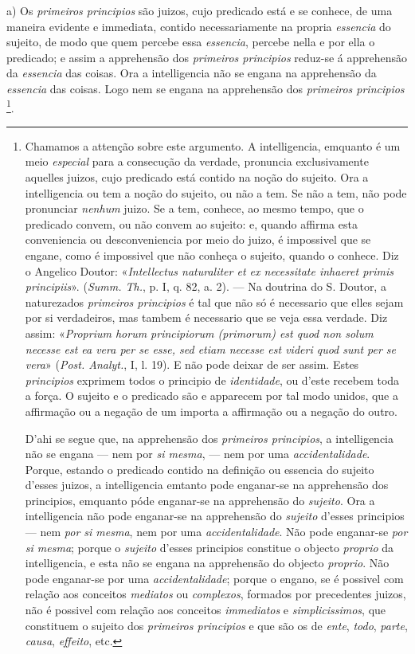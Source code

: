 a) Os \emph{primeiros principios} são juizos, cujo predicado está e se conhece, de uma maneira evidente e immediata, contido necessariamente na propria \emph{essencia} do sujeito, de modo que quem percebe essa \emph{essencia}, percebe nella e por ella o predicado; e assim a apprehensão dos \emph{primeiros principios} reduz-se á apprehensão da \emph{essencia} das coisas. Ora a intelligencia não se engana na apprehensão da \emph{essencia} das coisas. Logo nem se engana na apprehensão dos \emph{primeiros principios} \footnote{Chamamos a attenção sobre este argumento. A intelligencia, emquanto é um meio \emph{especial} para a consecução da verdade, pronuncia exclusivamente aquelles juizos, cujo predicado está contido na noção do sujeito. Ora a intelligencia ou tem a noção do sujeito, ou não a tem. Se não a tem, não pode pronunciar \emph{nenhum} juizo. Se a tem, conhece, ao mesmo tempo, que o predicado convem, ou não convem ao sujeito: e, quando affirma esta conveniencia ou desconveniencia por meio do juizo, é impossivel que se engane, como é impossivel que não conheça o sujeito, quando o conhece. Diz o Angelico Doutor: «\emph{Intellectus naturaliter et ex necessitate inhaeret primis principiis}». (\emph{Summ. Th.}, p. I, q. 82, a. 2). --- Na doutrina do S. Doutor, a naturezados \emph{primeiros principios} é tal que não só é necessario que elles sejam por si verdadeiros, mas tambem é necessario que se veja essa verdade. Diz assim: «\emph{Proprium horum principiorum (primorum) est quod non solum necesse est ea vera per se esse, sed etiam necesse est videri quod sunt per se vera}» (\emph{Post. Analyt.}, I, l. 19). E não pode deixar de ser assim. Estes \emph{principios} exprimem todos o principio de \emph{identidade}, ou d'este recebem toda a força. O sujeito e o predicado são e apparecem por tal modo unidos, que a affirmação ou a negação de um importa a affirmação ou a negação do outro.\par D'ahi se segue que, na apprehensão dos \emph{primeiros principios}, a intelligencia não se engana --- nem por \emph{si mesma}, --- nem por uma \emph{accidentalidade}. Porque, estando o predicado contido na definição ou essencia do sujeito d'esses juizos, a intelligencia emtanto pode enganar-se na apprehensão dos principios, emquanto póde enganar-se na apprehensão do \emph{sujeito}. Ora a intelligencia não pode enganar-se na apprehensão do \emph{sujeito} d'esses principios --- nem \emph{por si mesma}, nem por uma \emph{accidentalidade}. Não pode enganar-se \emph{por si mesma}; porque o \emph{sujeito} d'esses principios constitue o objecto \emph{proprio} da intelligencia, e esta não se engana na apprehensão do objecto \emph{proprio}. Não pode enganar-se por uma \emph{accidentalidade}; porque o engano, se é possivel com relação aos conceitos \emph{mediatos} ou \emph{complexos}, formados por precedentes juizos, não é possivel com relação aos conceitos \emph{immediatos} e \emph{simplicissimos}, que constituem o sujeito dos \emph{primeiros principios} e que são os de \emph{ente}, \emph{todo}, \emph{parte}, \emph{causa}, \emph{effeito}, etc.}.


